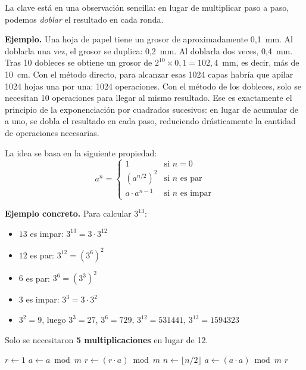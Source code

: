 \documentclass[twocolumn, 10pt]{article}
\begin{document}
La clave está en una observación sencilla: en lugar de multiplicar
paso a paso, podemos \emph{doblar} el resultado en cada ronda.

\textbf{Ejemplo.} Una hoja de papel tiene un grosor de aproximadamente
0{,}1~mm. Al doblarla una vez, el grosor se duplica: 0{,}2~mm. Al
doblarla dos veces, 0{,}4~mm. Tras 10 dobleces se obtiene un grosor de
$2^{10} \times 0{,}1 = 102{,}4$~mm, es decir, más de 10~cm. Con el
método directo, para alcanzar esas 1024 capas habría que apilar 1024
hojas una por una: 1024 operaciones. Con el método de los dobleces,
solo se necesitan 10 operaciones para llegar al mismo resultado. Ese
es exactamente el principio de la exponenciación por cuadrados
sucesivos: en lugar de acumular de a uno, se dobla el resultado en
cada paso, reduciendo drásticamente la cantidad de operaciones
necesarias.

La idea se basa en la siguiente propiedad:
\[
  a^n =
  \begin{cases}
    1 & \text{si } n = 0 \\
    \left(a^{n/2}\right)^2 & \text{si } n \text{ es par} \\
    a \cdot a^{n-1} & \text{si } n \text{ es impar}
  \end{cases}
\]

\textbf{Ejemplo concreto.} Para calcular $3^{13}$:
\begin{itemize}
  \item $13$ es impar: $3^{13} = 3 \cdot 3^{12}$
  \item $12$ es par: $3^{12} = (3^6)^2$
  \item $6$ es par: $3^{6} = (3^3)^2$
  \item $3$ es impar: $3^{3} = 3 \cdot 3^{2}$
  \item $3^2 = 9$, luego $3^3=27$, $3^6=729$, $3^{12}=531441$, $3^{13}=1594323$
\end{itemize}
Solo se necesitaron \textbf{5 multiplicaciones} en lugar de 12.

\begin{algorithm}[H]
\caption{Exponenciación por cuadrados sucesivos (rápida)}
\begin{algorithmic}[1]
  \State $r \gets 1$
  \State $a \gets a \bmod m$
      \State $r \gets (r \cdot a) \bmod m$
    \EndIf
    \State $n \gets \lfloor n/2 \rfloor$  
    \State $a \gets (a \cdot a) \bmod m$  
  \EndWhile
  \State \Return $r$
\EndFunction
\end{algorithmic}
\end{algorithm}
\end{document}
